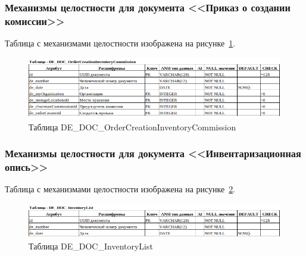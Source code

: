 
\subsubsection{Механизмы целостности для документа <<Приказ о создании комиссии>>}

Таблица с механизмами целостности изображена на рисунке~\ref{fig:Logic_DE_DOC_OrderCreationInventoryCommission}.

\begin{figure}[!h]
    \centering

    \includegraphics[width=18cm]
    {assets/database/Types/DE_DOC_OrderCreationInventoryCommission.png}

    \caption{Таблица DE\_DOC\_OrderCreationInventoryCommission}

    \label{fig:Logic_DE_DOC_OrderCreationInventoryCommission}
\end{figure}


\subsubsection{Механизмы целостности для документа <<Инвентаризационная опись>>}

Таблица с механизмами целостности изображена на рисунке~\ref{fig:Logic_DE_DOC_InventoryList}.

\begin{figure}[!h]
    \centering

    \includegraphics[width=18cm]
    {assets/database/Types/DE_DOC_InventoryList.png}

    \caption{Таблица DE\_DOC\_InventoryList}

    \label{fig:Logic_DE_DOC_InventoryList}
\end{figure}

